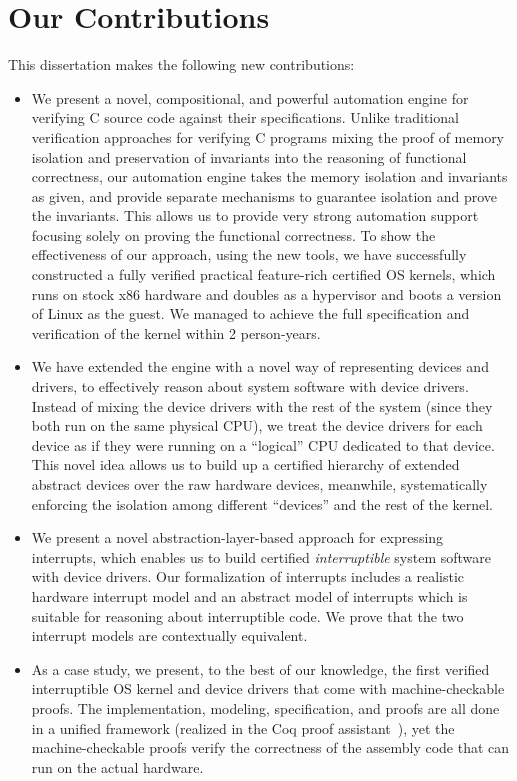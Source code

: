 \section{Our Contributions}

This dissertation makes the following new contributions:
\begin{itemize}
\item We present a novel, compositional, and powerful automation engine
for verifying C source code against their specifications. Unlike traditional
verification approaches for verifying C programs mixing the proof of memory isolation
and preservation of invariants into the reasoning of functional correctness,
our automation engine takes the memory isolation and invariants as given, and provide
separate mechanisms to guarantee isolation and prove the invariants.
This allows us to provide very strong automation support focusing solely on
proving the functional correctness.
To show the effectiveness of our approach, using the new tools, we have
successfully constructed a fully verified
practical feature-rich certified OS kernels, which runs
on stock x86 hardware and doubles as a hypervisor and boots a version of Linux as the guest.
We managed to achieve the full specification and verification of the kernel within
2 person-years.

\item We have extended the engine with a novel way of representing
devices and drivers, to effectively reason about system software
with device drivers.
Instead of mixing the device drivers
  with the rest of the system (since they both run on the same
  physical CPU), we treat the device drivers for each device as if
  they were running on a ``logical'' CPU dedicated to that device.
  This novel idea allows us to build up a certified hierarchy of
  extended abstract devices over the raw hardware devices, meanwhile,
  systematically enforcing the isolation among different ``devices''
  and the rest of the kernel.

\item We present a novel abstraction-layer-based approach for
  expressing interrupts, which enables us to build certified
  {\em interruptible} system software with device drivers. Our formalization of
  interrupts includes a realistic hardware interrupt model and an
  abstract model of interrupts which is suitable for reasoning about
  interruptible code. We prove that the two interrupt models are
  contextually equivalent.

\item As a case study, we present, to the best of our knowledge, the first verified
  interruptible OS kernel and device drivers that come with
  machine-checkable proofs.  The implementation, modeling, specification, and
  proofs are all done in a unified framework (realized in the Coq
  proof assistant~\cite{coq}), yet the machine-checkable proofs verify the
  correctness of the assembly code that can run on the actual
  hardware.
  

\end{itemize}
